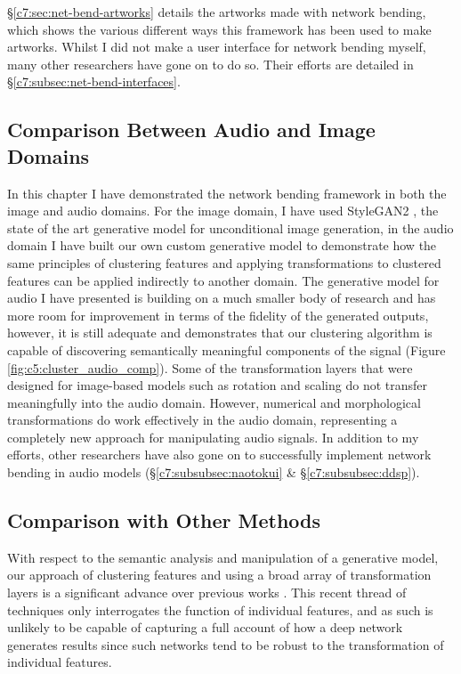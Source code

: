 \S \ref{c7:sec:net-bend-artworks} details the artworks made with network bending, which shows the various different ways this framework has been used to make artworks.
Whilst I did not make a user interface for network bending myself, many other researchers have gone on to do so.
Their efforts are detailed in \S \ref{c7:subsec:net-bend-interfaces}.

\subsection{Comparison Between Audio and Image Domains}

In this chapter I have demonstrated the network bending framework in both the image and audio domains. 
For the image domain, I have used StyleGAN2 \citep{karras2019analyzing}, the state of the art generative model for unconditional image generation, in the audio domain I have built our own custom generative model to demonstrate how the same principles of clustering features and applying transformations to clustered features can be applied indirectly to another domain. 
The generative model for audio I have presented is building on a much smaller body of research and has more room for improvement in terms of the fidelity of the generated outputs, however, it is still adequate and demonstrates that our clustering algorithm is capable of discovering semantically meaningful components of the signal (Figure \ref{fig:c5:cluster_audio_comp}). 
Some of the transformation layers that were designed for image-based models such as rotation and scaling do not transfer meaningfully into the audio domain. 
However, numerical and morphological transformations do work effectively in the audio domain, representing a completely new approach for manipulating audio signals. 
In addition to my efforts, other researchers have also gone on to successfully implement network bending in audio models (\S \ref{c7:subsubsec:naotokui} \& \S \ref{c7:subsubsec:ddsp}).

\subsection{Comparison with Other Methods}

With respect to the semantic analysis and manipulation of a generative model, our approach of clustering features and using a broad array of transformation layers is a significant advance over previous works \citep{Bau2017-vg,Bau2018-td,bau2019semantic, Brink2019-gc}. 
This recent thread of techniques only interrogates the function of individual features, and as such is unlikely to be capable of capturing a full account of how a deep network generates results since such networks tend to be robust to the transformation of individual features. 

